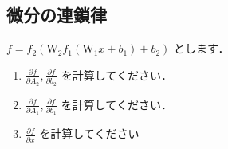 \subsection{微分の連鎖律}
  $f = f_2(\mathrm{W}_2 f_1(\mathrm{W}_1 x + b_1) + b_2)$ とします．
  \begin{enumerate}[label=(\roman*)]
    \item $\frac{\partial f}{\partial A_2}, \frac{\partial f}{\partial b_2}$ を計算してください．
    \item $\frac{\partial f}{\partial A_1}, \frac{\partial f}{\partial b_1}$ を計算してください．
    \item $\frac{\partial f}{\partial x}$ を計算してください
  \end{enumerate}
